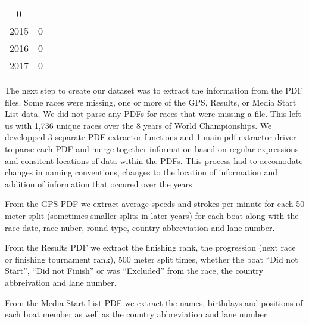 \documentclass[11pt,]{article}
\begin{document}
\begin{longtable}[]{@{}cc@{}}
\begin{minipage}[t]{0.27\columnwidth}
0\strut
\end{minipage}\tabularnewline
\begin{minipage}[t]{0.09\columnwidth}\centering\strut
2015\strut
\end{minipage} & \begin{minipage}[t]{0.27\columnwidth}\centering\strut
0\strut
\end{minipage}\tabularnewline
\begin{minipage}[t]{0.09\columnwidth}\centering\strut
2016\strut
\end{minipage} & \begin{minipage}[t]{0.27\columnwidth}\centering\strut
0\strut
\end{minipage}\tabularnewline
\begin{minipage}[t]{0.09\columnwidth}\centering\strut
2017\strut
\end{minipage} & \begin{minipage}[t]{0.27\columnwidth}\centering\strut
0\strut
\end{minipage}\tabularnewline
\bottomrule
\end{longtable}

The next step to create our dataset was to extract the information from
the PDF files. Some races were missing, one or more of the GPS, Results,
or Media Start List data. We did not parse any PDFs for races that were
missing a file. This left us with 1,736 unique races over the 8 years of
World Championships. We developped 3 separate PDF extractor functions
and 1 main pdf extractor driver to parse each PDF and merge together
information based on regular expressions and consitent locations of data
within the PDFs. This process had to accomodate changes in naming
conventions, changes to the location of information and addition of
information that occured over the years.

From the GPS PDF we extract average speeds and strokes per minute for
each 50 meter split (sometimes smaller splits in later years) for each
boat along with the race date, race nuber, round type, country
abbreviation and lane number.

From the Results PDF we extract the finishing rank, the progression
(next race or finishing tournament rank), 500 meter split times, whether
the boat ``Did not Start'', ``Did not Finish'' or was ``Excluded'' from
the race, the country abbreivation and lane number.

From the Media Start List PDF we extract the names, birthdays and
positions of each boat member as well as the country abbreviation and
lane number
\end{document}
